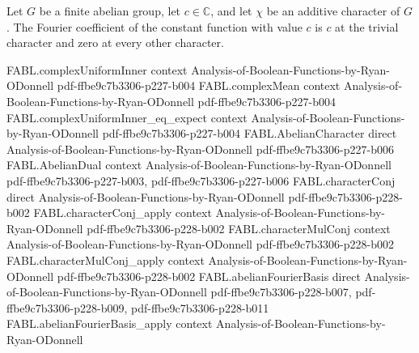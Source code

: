 \begin{theorem}
\label{FABL.abelianFourierCoeff_const}
\leanok
{}
Let $G$ be a finite abelian group, let $c\in\mathbb{C}$, and let $\chi$ be an additive
character of $G$. The Fourier coefficient of the constant function with value $c$ is $c$
at the trivial character and zero at every other character.
\end{theorem}

\begin{theorem}
\label{FABL.complexMean_eq_abelianFourierCoeff_zero}
\leanok
{}
\proofstep
  {FABL.complexUniformInner}
  {context}
  {Analysis-of-Boolean-Functions-by-Ryan-ODonnell}
  {pdf-ffbe9c7b3306-p227-b004}
\proofstep
  {FABL.complexMean}
  {context}
  {Analysis-of-Boolean-Functions-by-Ryan-ODonnell}
  {pdf-ffbe9c7b3306-p227-b004}
\proofstep
  {FABL.complexUniformInner_eq_expect}
  {context}
  {Analysis-of-Boolean-Functions-by-Ryan-ODonnell}
  {pdf-ffbe9c7b3306-p227-b004}
\proofstep
  {FABL.AbelianCharacter}
  {direct}
  {Analysis-of-Boolean-Functions-by-Ryan-ODonnell}
  {pdf-ffbe9c7b3306-p227-b006}
\proofstep
  {FABL.AbelianDual}
  {context}
  {Analysis-of-Boolean-Functions-by-Ryan-ODonnell}
  {pdf-ffbe9c7b3306-p227-b003,
    pdf-ffbe9c7b3306-p227-b006}
\proofstep
  {FABL.characterConj}
  {direct}
  {Analysis-of-Boolean-Functions-by-Ryan-ODonnell}
  {pdf-ffbe9c7b3306-p228-b002}
\proofstep
  {FABL.characterConj_apply}
  {context}
  {Analysis-of-Boolean-Functions-by-Ryan-ODonnell}
  {pdf-ffbe9c7b3306-p228-b002}
\proofstep
  {FABL.characterMulConj}
  {context}
  {Analysis-of-Boolean-Functions-by-Ryan-ODonnell}
  {pdf-ffbe9c7b3306-p228-b002}
\proofstep
  {FABL.characterMulConj_apply}
  {context}
  {Analysis-of-Boolean-Functions-by-Ryan-ODonnell}
  {pdf-ffbe9c7b3306-p228-b002}
\proofstep
  {FABL.abelianFourierBasis}
  {direct}
  {Analysis-of-Boolean-Functions-by-Ryan-ODonnell}
  {pdf-ffbe9c7b3306-p228-b007,
    pdf-ffbe9c7b3306-p228-b009,
    pdf-ffbe9c7b3306-p228-b011}
\proofstep
  {FABL.abelianFourierBasis_apply}
  {context}
  {Analysis-of-Boolean-Functions-by-Ryan-ODonnell}

\end{theorem}
